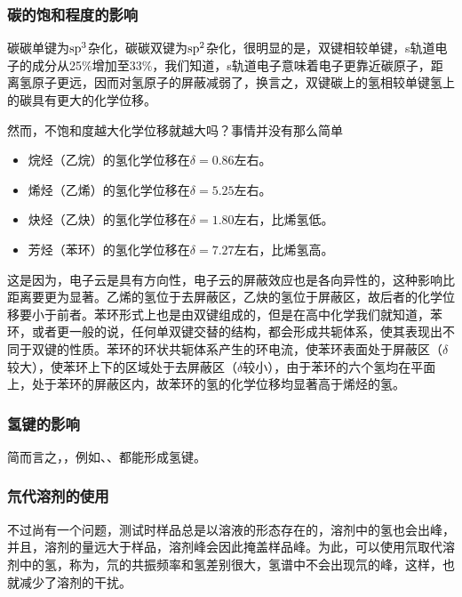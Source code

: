 \subsubsection{碳的饱和程度的影响}
碳碳单键为$\text{sp}^3$杂化，碳碳双键为$\text{sp}^2$杂化，很明显的是，双键相较单键，s轨道电子的成分从25\%增加至33\%，我们知道，s轨道电子意味着电子更靠近碳原子，距离氢原子更远，因而对氢原子的屏蔽减弱了，换言之，双键碳上的氢相较单键氢上的碳具有更大的化学位移。

然而，不饱和度越大化学位移就越大吗？事情并没有那么简单
\begin{itemize}
    \item 烷烃（乙烷）的氢化学位移在$\delta=0.86$左右。
    \item 烯烃（乙烯）的氢化学位移在$\delta=5.25$左右。
    \item 炔烃（乙炔）的氢化学位移在$\delta=1.80$左右，比烯氢低。
    \item 芳烃（苯环）的氢化学位移在$\delta=7.27$左右，比烯氢高。
\end{itemize}
这是因为，电子云是具有方向性，电子云的屏蔽效应也是各向异性的，这种影响比距离要更为显著。乙烯的氢位于去屏蔽区，乙炔的氢位于屏蔽区，故后者的化学位移要小于前者。苯环形式上也是由双键组成的，但是在高中化学我们就知道，苯环，或者更一般的说，任何单双键交替的结构，都会形成共轭体系，使其表现出不同于双键的性质。苯环的环状共轭体系产生的环电流，使苯环表面处于屏蔽区（$\delta$较大），使苯环上下的区域处于去屏蔽区（$\delta$较小），由于苯环的六个氢均在平面上，处于苯环的屏蔽区内，故苯环的氢的化学位移均显著高于烯烃的氢。

\subsubsection{氢键的影响}
简而言之，，例如、、都能形成氢键。

\subsubsection{氘代溶剂的使用}
不过尚有一个问题，测试时样品总是以溶液的形态存在的，溶剂中的氢也会出峰，并且，溶剂的量远大于样品，溶剂峰会因此掩盖样品峰。为此，可以使用氘取代溶剂中的氢，称为，氘的共振频率和氢差别很大，氢谱中不会出现氘的峰，这样，也就减少了溶剂的干扰。

